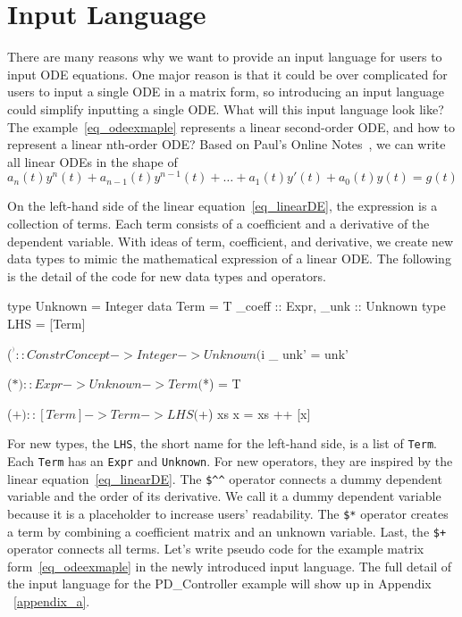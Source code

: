 \section{Input Language}
\label{sec_input}
There are many reasons why we want to provide an input language for users to input ODE equations. One major reason is that it could be over complicated for users to input a single ODE in a matrix form, so introducing an input language could simplify inputting a single ODE. What will this input language look like? The example~\ref{eq_odeexmaple} represents a linear second-order ODE, and how to represent a linear nth-order ODE? Based on Paul's Online Notes~\citep{paullinearode}, we can write all linear ODEs in the shape of 
\begin{equation} \label{eq_linearDE}
	a_n(t)y^n(t) + a_{n-1}(t)y^{n-1}(t) + \dots + a_1(t)y'(t) + a_0(t)y(t) = g(t)
\end{equation}

On the left-hand side of the linear equation~\ref{eq_linearDE}, the expression is a collection of terms. Each term consists of a coefficient and a derivative of the dependent variable. With ideas of term, coefficient, and derivative, we create new data types to mimic the mathematical expression of a linear ODE. The following is the detail of the code for new data types and operators.

\begin{haskell1}
type Unknown = Integer
data Term = T{
	_coeff :: Expr,
	_unk :: Unknown
}
type LHS = [Term]

($^^) :: ConstrConcept -> Integer -> Unknown
($^^) _ unk' = unk'

($*) :: Expr -> Unknown -> Term
($*) = T

($+) :: [Term] -> Term -> LHS
($+) xs x  = xs ++ [x]
\end{haskell1}

For new types, the \verb|LHS|, the short name for the left-hand side, is a list of \verb|Term|. Each \verb|Term| has an \verb|Expr| and \verb|Unknown|. For new operators, they are inspired by the linear equation~\ref{eq_linearDE}. The \verb|$^^| operator connects a dummy dependent variable and the order of its derivative. We call it a dummy dependent variable because it is a placeholder to increase users' readability. The \verb|$*| operator creates a term by combining a coefficient matrix and an unknown variable. Last, the \verb|$+| operator connects all terms. Let's write pseudo code for the example matrix form~\ref{eq_odeexmaple} in the newly introduced input language. The full detail of the input language for the PD\_Controller example will show up in Appendix ~\ref{appendix_a}.

